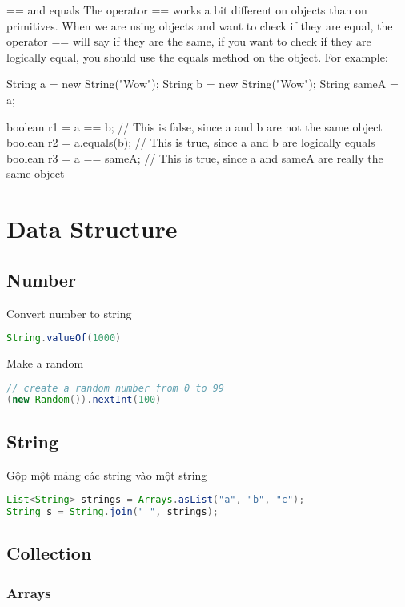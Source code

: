 == and equals
The operator == works a bit different on objects than on primitives. When we are using objects and want to check if they are equal, the operator == will say if they are the same, if you want to check if they are logically equal, you should use the equals method on the object. For example:

String a = new String("Wow");
String b = new String("Wow");
String sameA = a;

boolean r1 = a == b;      // This is false, since a and b are not the same object
boolean r2 = a.equals(b); // This is true, since a and b are logically equals
boolean r3 = a == sameA;  // This is true, since a and sameA are really the same object

\chapter{Data Structure}

\section{Number}

Convert number to string

\begin{lstlisting}[language=Java]
String.valueOf(1000)
\end{lstlisting}

Make a random

\begin{lstlisting}[language=Java]
// create a random number from 0 to 99
(new Random()).nextInt(100)
\end{lstlisting}


\section{String}

Gộp một mảng các string vào một string

\begin{lstlisting}[language=Java]
List<String> strings = Arrays.asList("a", "b", "c");
String s = String.join(" ", strings);
\end{lstlisting}

\section{Collection}

\subsection{Arrays}

